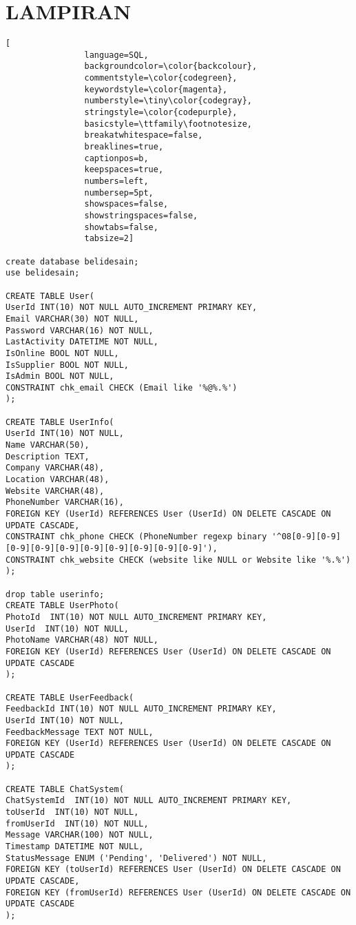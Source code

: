 \chapter*{LAMPIRAN}

\begin{lstlisting}[
				language=SQL,
				backgroundcolor=\color{backcolour},   
				commentstyle=\color{codegreen},
				keywordstyle=\color{magenta},
				numberstyle=\tiny\color{codegray},
				stringstyle=\color{codepurple},
				basicstyle=\ttfamily\footnotesize,
				breakatwhitespace=false,         
				breaklines=true,                 
				captionpos=b,                    
				keepspaces=true,                 
				numbers=left,                    
				numbersep=5pt,                  
				showspaces=false,                
				showstringspaces=false,
				showtabs=false,                  
				tabsize=2]
				
create database belidesain;
use belidesain;

CREATE TABLE User(
UserId INT(10) NOT NULL AUTO_INCREMENT PRIMARY KEY,
Email VARCHAR(30) NOT NULL,
Password VARCHAR(16) NOT NULL,
LastActivity DATETIME NOT NULL,
IsOnline BOOL NOT NULL,
IsSupplier BOOL NOT NULL,
IsAdmin BOOL NOT NULL,
CONSTRAINT chk_email CHECK (Email like '%@%.%')
);

CREATE TABLE UserInfo(
UserId INT(10) NOT NULL,
Name VARCHAR(50),
Description TEXT,
Company VARCHAR(48),
Location VARCHAR(48),
Website VARCHAR(48),
PhoneNumber VARCHAR(16),
FOREIGN KEY (UserId) REFERENCES User (UserId) ON DELETE CASCADE ON UPDATE CASCADE,
CONSTRAINT chk_phone CHECK (PhoneNumber regexp binary '^08[0-9][0-9][0-9][0-9][0-9][0-9][0-9][0-9][0-9][0-9]'),
CONSTRAINT chk_website CHECK (website like NULL or Website like '%.%')
);

drop table userinfo;
CREATE TABLE UserPhoto(
PhotoId  INT(10) NOT NULL AUTO_INCREMENT PRIMARY KEY,
UserId  INT(10) NOT NULL,
PhotoName VARCHAR(48) NOT NULL,
FOREIGN KEY (UserId) REFERENCES User (UserId) ON DELETE CASCADE ON UPDATE CASCADE
);

CREATE TABLE UserFeedback(
FeedbackId INT(10) NOT NULL AUTO_INCREMENT PRIMARY KEY,
UserId INT(10) NOT NULL,
FeedbackMessage TEXT NOT NULL,
FOREIGN KEY (UserId) REFERENCES User (UserId) ON DELETE CASCADE ON UPDATE CASCADE
);

CREATE TABLE ChatSystem(
ChatSystemId  INT(10) NOT NULL AUTO_INCREMENT PRIMARY KEY,
toUserId  INT(10) NOT NULL,
fromUserId  INT(10) NOT NULL,
Message VARCHAR(100) NOT NULL,
Timestamp DATETIME NOT NULL,
StatusMessage ENUM ('Pending', 'Delivered') NOT NULL,
FOREIGN KEY (toUserId) REFERENCES User (UserId) ON DELETE CASCADE ON UPDATE CASCADE,
FOREIGN KEY (fromUserId) REFERENCES User (UserId) ON DELETE CASCADE ON UPDATE CASCADE
);


\end{lstlisting}
